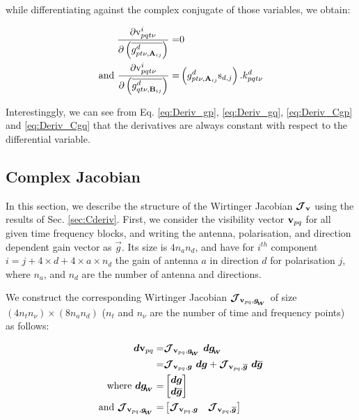 \noindent while differentiating against the complex conjugate of those
variables, we obtain:

\begin{alignat}{3}
\label{eq:Deriv_Cgp}
\frac{\partial \mathrm{v}^i_{pqt\nu}}{\partial \conjp{g^{d}_{pt\nu,\textbf{A}_{ij}}}}=&0\\
\label{eq:Deriv_Cgq}
\text{and}\ 
\frac{\partial \mathrm{v}^i_{pqt\nu}}{\partial \conjp{g^{d}_{qt\nu,\textbf{B}_{ij}}}}=&
\left(g^{d}_{pt\nu,\textbf{A}_{ij}}\text{s}_{d,j}\right).k^{d}_{pqt\nu}
\end{alignat}

\noindent Interestinggly, we can see from Eq. \ref{eq:Deriv_gp},
\ref{eq:Deriv_gq}, \ref{eq:Deriv_Cgp} and \ref{eq:Deriv_Cgq} that the
derivatives are always constant with respect to the differential
variable.

\subsection{Complex Jacobian}

In this section, we describe the structure of the Wirtinger Jacobian $\bm{\mathcal{J}}_{\textbf{v}}$ using the
results of Sec. \ref{sec:Cderiv}.
First, we consider the visibility vector $\textbf{v}_{pq}$
for all given time frequency blocks, and writing the antenna,
polarisation, and direction dependent gain vector as
$\vec{g}$. Its size is $4n_an_d$, and have for $i^{th}$ component
$i=j+4\times d+4\times a \times n_d$ the gain of antenna $a$ in
direction $d$ for polarisation $j$, where $n_a$, and $n_d$ are the
number of antenna and directions.

We construct the corresponding Wirtinger Jacobian $\bm{\mathcal{J}}_{{\textbf{v}_{pq}},\bm{g_{\!_{W}}}}$ of size $(4n_t n_{\nu})\times (8n_a n_d)$ ($n_t$
and $n_{\nu}$ are the number of time and frequency points) as follows:

\begin{alignat}{2}
\label{eq:dV}
\dbf\vbl=&\JVpq\ \dbf\gwirt\\
=&\JVpqg\ \dbf\g+\JVpqCg\ \dbf\conj{\g}\\
\text{where }\dgwirt=&
\begin{bmatrix}
\dbf\vec{g}\\
\dbf\conj{\vec{g}}
\end{bmatrix}\\
\text{and }\JVpq=&
\begin{bmatrix}
\JVpqg & \JVpqCg
\end{bmatrix}
\end{alignat}

